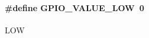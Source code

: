 \paragraph[{\texorpdfstring{G\+P\+I\+O\+\_\+\+V\+A\+L\+U\+E\+\_\+\+L\+OW}{GPIO_VALUE_LOW}}]{\setlength{\rightskip}{0pt plus 5cm}\#define G\+P\+I\+O\+\_\+\+V\+A\+L\+U\+E\+\_\+\+L\+OW~0}\hypertarget{group___g_p_i_o___v_a_l_u_e___d_e_f_ga658ffdd702f757e670ab54abd23b3be1}{}\label{group___g_p_i_o___v_a_l_u_e___d_e_f_ga658ffdd702f757e670ab54abd23b3be1}
L\+OW 